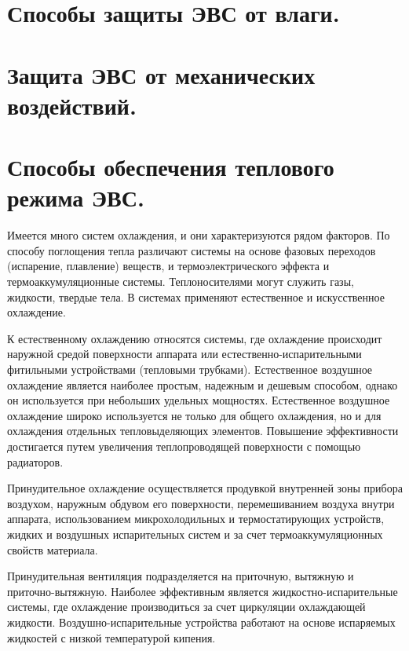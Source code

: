 \documentclass[unicode, 12pt, a4paper, oneside]{article}
\begin{document}
\section{Способы защиты ЭВС от влаги.}

\section{Защита ЭВС от механических воздействий.}

\section{Способы обеспечения теплового режима ЭВС.}

Имеется много систем охлаждения, и они характеризуются рядом факторов. По способу поглощения тепла различают системы на основе фазовых переходов (испарение, плавление) веществ, и термоэлектрического эффекта и термоаккумуляционные системы. Теплоносителями могут служить газы, жидкости, твердые тела. В системах применяют естественное и искусственное охлаждение.

К естественному охлаждению относятся системы, где охлаждение происходит наружной средой поверхности аппарата или естественно-испарительными фитильными устройствами (тепловыми трубками). Естественное воздушное охлаждение является наиболее простым, надежным и дешевым способом, однако он используется при небольших удельных мощностях.  Естественное воздушное охлаждение широко используется не только для общего охлаждения, но и для охлаждения отдельных тепловыделяющих элементов. Повышение эффективности достигается путем увеличения теплопроводящей поверхности с помощью радиаторов.

Принудительное охлаждение осуществляется продувкой внутренней зоны прибора воздухом, наружным обдувом его поверхности, перемешиванием воздуха внутри аппарата, использованием микрохолодильных и термостатирующих устройств, жидких и воздушных испарительных систем и за счет термоаккумуляционных свойств материала.

 Принудительная вентиляция подразделяется на приточную, вытяжную и приточно-вытяжную. Наиболее эффективным является жидкостно-испарительные системы, где охлаждение производиться за счет циркуляции охлаждающей жидкости. Воздушно-испарительные устройства работают на основе испаряемых жидкостей с низкой температурой кипения.
 
\end{document}
